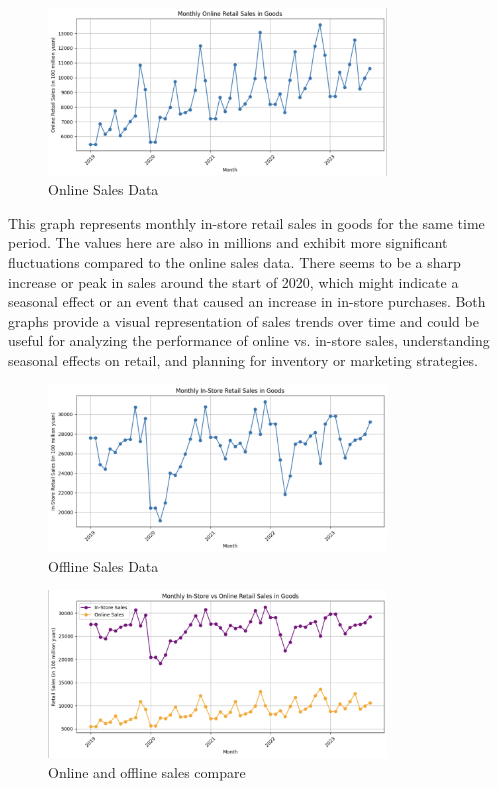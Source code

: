 \documentclass{article}
\begin{document}
\begin{figure}[h]
  \centering
  \includegraphics[width=0.8\textwidth]{online_sales_data.png}
  \caption{Online Sales Data}
  \label{fig:yourlabel}
\end{figure}

This graph represents monthly in-store retail sales in goods for the same time period.
The values here are also in millions and exhibit more significant fluctuations compared to the online sales data.
There seems to be a sharp increase or peak in sales around the start of 2020, which might indicate a seasonal effect or an event that caused an increase in in-store purchases.
Both graphs provide a visual representation of sales trends over time and could be useful for analyzing the performance of online vs. in-store sales, understanding seasonal effects on retail, and planning for inventory or marketing strategies.

\begin{figure}[h]
  \centering
  \includegraphics[width=0.8\textwidth]{offline_sales_data.png}
  \caption{Offline Sales Data}
  \label{fig:yourlabel}
\end{figure}


\begin{figure}[h]
  \centering
  \includegraphics[width=0.8\textwidth]{online_offline_Compare.png}
  \caption{Online and offline sales compare}
  \label{fig:yourlabel}
\end{figure}
\end{document}
